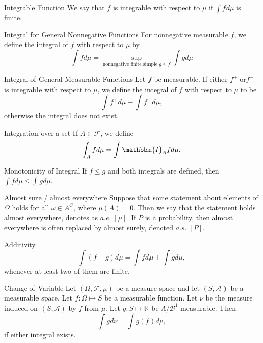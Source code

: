 \documentclass[avery5371,grid]{flashcards}
\begin{document}
\begin{flashcard}[Definition]{Integrable Function}
We say that $f$ is integrable with respect to $\mu$ if $\int f d\mu$ is finite. 
\end{flashcard}

\begin{flashcard}[Definition]{Integral for General Nonnegative Functions}
 For nonnegative measurable $f$, we define the integral of $f$ with respect to $\mu$ by
 \[
 \int f d\mu = \sup_{\text{nonnegative finite simple } g \le f} \int g d\mu 
 \]
\end{flashcard}

\begin{flashcard}[Definition]{Integral of General Measurable Functions}
Let $f$ be measurable. If either $f^+$ or$f^-$ is integrable with respect to $\mu$, we 
define the integral of $f$ with respect to $\mu$ to be 
\[
\int f^+ d\mu - \int f^- d\mu,
\]
 otherwise the integral does not exist.
\end{flashcard}

\begin{flashcard}[Definition]{Integration over a set}
 If $A \in \mathcal{F}$, we define 
 \[
 \int_A f d\mu = \int \mathbbm{I}_A f d\mu.
 \]
\end{flashcard}

\begin{flashcard}[Proposition]{Monotonicity of Integral}
 If $f \le g$ and both integrals are defined, then $\int f d\mu \le \int g d\mu$.
\end{flashcard}

\begin{flashcard}[Definition]{Almost sure / almost everywhere}
 Suppose that some statement about elements of $\Omega$ holds for all $\omega \in A^C$,
 where $\mu\left( A \right) = 0$. Then we say that the statement holds almost everywhere,
 denotes as $a.e. \; [\mu]$. If $P$ is a probability, then almost everywhere is often replaced
 by almost surely, denoted $a.s. \; [P]$.
\end{flashcard}

\begin{flashcard}[Theorem]{Additivity}
 \[
 \int \left( f +g \right) d\mu = \int f d\mu + \int g d\mu,
 \]
 whenever at least two of them are finite. 
\end{flashcard}

\begin{flashcard}[Theorem]{Change of Variable}
Let $\left( \Omega, \mathcal{F}, \mu \right)$ be a measure space and let $\left( S, \mathcal{A} \right)$
be a measurable space. Let $f : \Omega \mapsto S$ be a measurable function. Let
$\nu$ be the measure induced on $\left( S,\mathcal{A} \right)$ by $f$ from
$\mu$. Let $g : S \mapsto \mathbb{R}$ be $A/\mathcal{B}^1$ measurable. Then
\[
\int g d\nu = \int g(f) d\mu,
\]
if either integral exists.
\end{flashcard}
\end{document}
